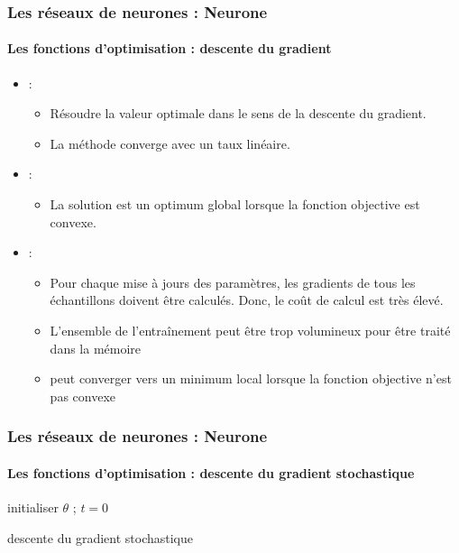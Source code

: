 \documentclass[xcolor=table]{beamer}
\begin{document}
\begin{frame}
\frametitle{Les réseaux de neurones : Neurone}
\framesubtitle{Les fonctions d'optimisation : descente du gradient}

\begin{itemize}
	\item {} : 
	\begin{itemize}
		\item Résoudre la valeur optimale dans le sens de la descente du gradient.
		\item La méthode converge avec un taux linéaire.
	\end{itemize}
	\item {} : 
	\begin{itemize}
		\item La solution est un optimum global lorsque la fonction objective est convexe.
	\end{itemize}
	\item {} : 
	\begin{itemize}
		\item Pour chaque mise à jours des paramètres, les gradients de tous les échantillons doivent être calculés. Donc, le coût de calcul est très élevé. 
		\item L'ensemble de l'entraînement peut être trop volumineux pour être traité dans la mémoire
		\item peut converger vers un minimum local lorsque la fonction objective n'est pas convexe
	\end{itemize}
\end{itemize}

\end{frame}

\begin{frame}
\frametitle{Les réseaux de neurones : Neurone}
\framesubtitle{Les fonctions d'optimisation : descente du gradient stochastique}

\begin{algorithm}[H]
	\KwResult{$ \theta $}
	initialiser $ \theta $ ; $ t = 0 $\;
	\caption{descente du gradient stochastique}
\end{algorithm}

\end{frame}
\end{document}
